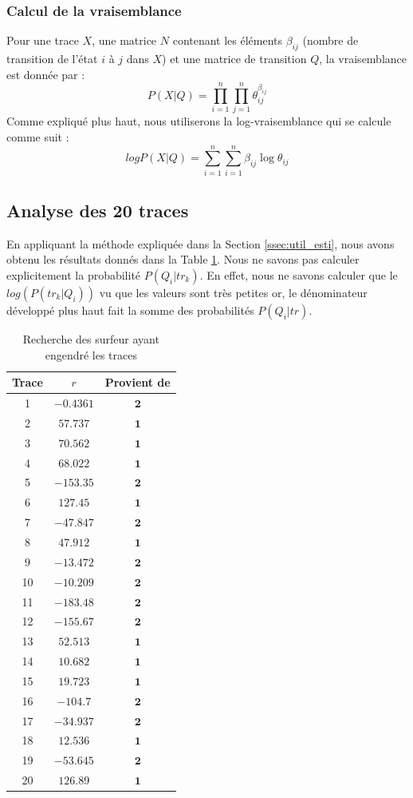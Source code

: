 \documentclass[a4paper,titlepage]{report}
\begin{document}
\subsubsection{Calcul de la vraisemblance}
Pour une trace $X$, une matrice $N$ contenant les éléments $\beta_{ij}$ (nombre de transition de l'état $i$ à $j$ dans $X$) et une matrice de transition $Q$, la vraisemblance est donnée par : 
\[
P(X|Q) = \prod\limits_{i = 1}^n \prod\limits_{j = 1}^n \theta_{ij}^{\beta_{ij}}
\]
Comme expliqué plus haut, nous utiliserons la log-vraisemblance qui se calcule comme suit :
\[
log P(X|Q) = \sum\limits_{i = 1}^n\sum\limits_{i = 1}^n \beta_{ij} \log \theta_{ij}
\]

\subsection{Analyse des 20 traces}
En appliquant la méthode expliquée dans la Section \ref{ssec:util_esti}, nous avons obtenu les résultats donnés dans la Table \ref{tab:surf_trace}. Nous ne savons pas calculer explicitement la probabilité $ P(Q_i|tr_k)$. En effet, nous ne savons calculer que le $log( P(tr_k|Q_i) )$ vu que les valeurs sont très petites or, le dénominateur développé plus haut fait la somme des probabilités  $ P(Q_i|tr)$.  
\begin{table}[ht]
	\center
	\begin{tabular}{|c|cc|}
		\hline
		Trace & $r$ & Provient de \\
		\hline
		1 & $ -0.4361$ & $\mathbf{2}$ \\
		2 & $57.737$ & $\mathbf{1}$ \\
		3 & $70.562$ & $\mathbf{1}$ \\
		4 & $68.022$ & $\mathbf{1}$ \\
		5 & $-153.35$ & $\mathbf{2}$ \\
		6 & $127.45$ & $\mathbf{1}$ \\
		7 & $-47.847$ & $\mathbf{2}$ \\
		8 & $47.912$ & $\mathbf{1}$ \\
		9 & $-13.472$ & $\mathbf{2}$ \\
		10 & $-10.209$ & $\mathbf{2}$ \\
		11 & $-183.48$ & $\mathbf{2}$ \\
		12 & $-155.67$ & $\mathbf{2}$ \\
		13 & $52.513$ & $\mathbf{1}$ \\
		14 & $10.682$ & $\mathbf{1}$ \\
		15 & $19.723$ & $\mathbf{1}$ \\
		16 & $-104.7$ & $\mathbf{2}$ \\
		17 & $-34.937$ & $\mathbf{2}$ \\
		18 & $12.536$ & $\mathbf{1}$ \\
		19 & $-53.645$ & $\mathbf{2}$ \\
		20 & $126.89$ & $\mathbf{1}$ \\
		\hline
	\end{tabular}
	\caption{Recherche des surfeur ayant engendré les traces}
	\label{tab:surf_trace}
\end{table}
\end{document}
